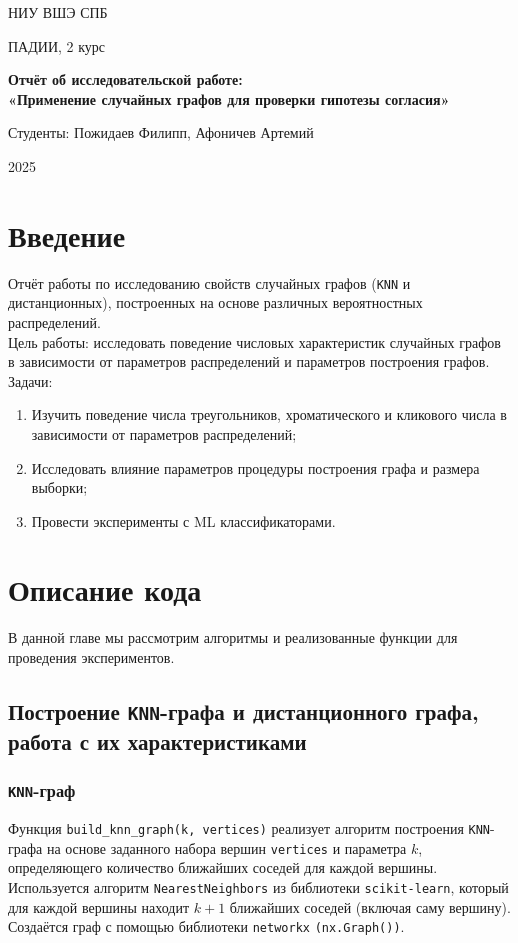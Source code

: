 \documentclass[12pt,a4paper]{report}
\newcommand{\University}{НИУ ВШЭ СПБ}
\newcommand{\Faculty}{ПАДИИ, 2 курс}
\newcommand{\Title}{Отчёт об исследовательской работе:\\«Применение случайных графов для проверки гипотезы согласия»}
\newcommand{\Year}{2025}
\begin{document}
\begin{titlepage}
  \centering
  {\large \University\par}
  \vspace{1cm}
  {\large \Faculty\par}
  \vfill
  {\Large \textbf{\Title}\par}
  \vfill
  {\large Студенты: Пожидаев Филипп, Афоничев Артемий}
  \vfill
  {\large \Year\par}
\end{titlepage}

\tableofcontents
\clearpage

\chapter{Введение}
Отчёт работы по исследованию свойств случайных графов (\texttt{KNN} и дистанционных), построенных на основе различных вероятностных распределений.\\
Цель работы: исследовать поведение числовых характеристик случайных графов в зависимости от параметров распределений и параметров построения графов.\\
Задачи:
\begin{enumerate}
  \item Изучить поведение числа треугольников, хроматического и кликового числа в зависимости от параметров распределений;
  \item Исследовать влияние параметров процедуры построения графа и размера выборки;
  \item Провести эксперименты с ML классификаторами.
\end{enumerate}

\chapter{Описание кода}
В данной главе мы рассмотрим алгоритмы и реализованные функции для проведения экспериментов.
\section{Построение \texttt{KNN}-графа и дистанционного графа, работа с их характеристиками}
\subsection{\texttt{KNN}-граф}
Функция \texttt{build\_knn\_graph(k, vertices)} реализует алгоритм построения \texttt{KNN}-графа на основе заданного набора вершин \texttt{vertices} и параметра $k$, определяющего количество ближайших соседей для каждой вершины.\\
Используется алгоритм \texttt{NearestNeighbors} из библиотеки \texttt{scikit-learn}, который для каждой вершины находит $k + 1$ ближайших соседей (включая саму вершину).
Создаётся граф с помощью библиотеки \texttt{networkx} \texttt{(nx.Graph())}.
\end{document}
